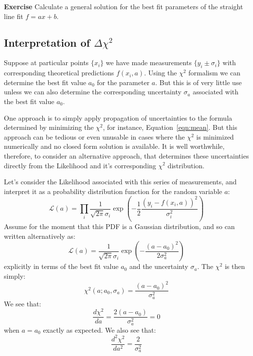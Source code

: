\documentclass[12pt]{article}
\begin{document}
{\bf Exercise} Calculate a general solution for the best fit parameters of the straight line fit $f = a x + b$.

\subsection{Interpretation of $\Delta \chi^2$}

Suppose at particular points $\{x_i\}$ we have made measurements $\{y_i \pm \sigma_i\}$ with corresponding theoretical predictions $f(x_i, a)$.  Using the $\chi^2$ formalism we can determine the best fit value $a_0$ for the parameter $a$.  But this is of very little use unless we can also determine the corresponding uncertainty $\sigma_a$ associated with the best fit value $a_0$.  

One approach is to simply apply propagation of uncertainties to the formula determined by minimizing the $\chi^2$, for instance, Equation~\ref{eqn:mean}.  But this approach can be tedious or even unusable in cases where the $\chi^2$ is minimized numerically and no closed form solution is available.   It is well worthwhile, therefore, to consider an alternative approach, that determines these uncertainties directly from the Likelihood and it's corresponding $\chi^2$ distribution.

Let's consider the Likelihood associated with this series of measurements, and interpret it as a probability distribution function for the random variable $a$:
\begin{displaymath}
\mathcal{L}(a) = \prod_i \frac{1}{\sqrt{2\pi} \sigma_i} \exp\left(-\frac{1}{2} \frac{(y_i-f(x_i,a))^2}{\sigma_i^2}\right)
\end{displaymath}
Assume for the moment that this PDF is a Gaussian distribution, and so can written alternatively
as:
\begin{displaymath}
\mathcal{L}(a) =  \frac{1}{\sqrt{2\pi} \sigma_i} \exp\left(-\frac{(a-a_0)^2}{2\sigma_a^2}\right)
\end{displaymath}
explicitly in terms of the best fit value $a_0$ and the uncertainty $\sigma_a$.  The $\chi^2$ is then simply:
\begin{equation} \label{eqn:chisqa}
\chi^2(a; a_0, \sigma_a) = \frac{(a-a_0)^2}{\sigma_a^2}
\end{equation}
We see that:
\begin{displaymath}
\frac{d\chi^2}{da} = \frac{2 (a-a_0)}{\sigma_a^2} = 0
\end{displaymath}
when $a=a_0$ exactly as expected.  We also see that:
\begin{displaymath}
\frac{d^2\chi^2}{da^2} = \frac{2}{\sigma_a^2}
\end{displaymath}
\end{document}
